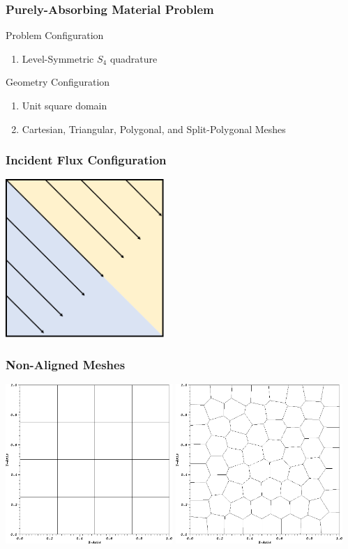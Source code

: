 \documentclass[compress,10pt]{beamer}
\begin{document}
\begin{frame}[t]
{
\frametitle{Purely-Absorbing Material Problem}
\begin{block}{Problem Configuration}
\begin{enumerate}
\item Level-Symmetric $S_4$ quadrature
\end{enumerate}
\end{block}
\begin{block}{Geometry Configuration}
\begin{enumerate}
\item Unit square domain
\item Cartesian, Triangular, Polygonal, and Split-Polygonal Meshes
\end{enumerate}
\end{block}
}
{
\frametitle{Incident Flux Configuration}
\vspace{1cm}
\hspace*{2.75cm}
{}\includegraphics[width=0.45\textwidth]{images/PA_Shading.png}
}
{
\frametitle{Non-Aligned Meshes}
\vspace{0.75cm}
\hspace*{0.25cm}
{}\includegraphics[width=0.475\textwidth]{images/PAMesh_Cart.png} 
{}\includegraphics[width=0.475\textwidth]{images/PAMesh_Poly.png}
}
\end{frame}
\end{document}

